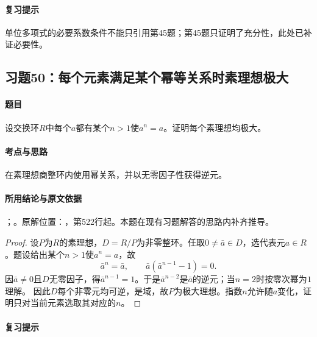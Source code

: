 \paragraph{复习提示}

单位多项式的必要系数条件不能只引用第45题；第45题只证明了充分性，此处已补证必要性。



\subsection{习题50：每个元素满足某个幂等关系时素理想极大}

\label{ex:3:50}

\paragraph{题目}

设交换环$R$中每个$a$都有某个$n>1$使$a^n=a$。证明每个素理想均极大。

\paragraph{考点与思路}

在素理想商整环内使用幂关系，并以无零因子性获得逆元。

\paragraph{所用结论与原文依据}

；。原解位置：，第522行起。本题在现有习题解答的思路内补齐推导。


\begin{proof}

设$P$为$R$的素理想，$D=R/P$为非零整环。任取$0\ne\bar a\in D$，选代表元$a\in R$。题设给出某个$n>1$使$a^n=a$，故
\[
\bar a^n=\bar a,\qquad \bar a(\bar a^{n-1}-1)=0.
\]
因$\bar a\ne0$且$D$无零因子，得$\bar a^{n-1}=1$。于是$\bar a^{n-2}$是$\bar a$的逆元；当$n=2$时按零次幂为$1$理解。
因此$D$每个非零元均可逆，是域，故$P$为极大理想。指数$n$允许随$a$变化，证明只对当前元素选取其对应的$n$。

\end{proof}

\paragraph{复习提示}

